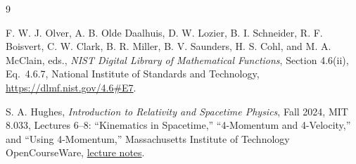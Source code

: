 \documentclass[12pt]{article}
\begin{document}
\begin{thebibliography}{9}
\small
{}
\raggedright
{}

F. W. J. Olver, A. B. Olde Daalhuis, D. W. Lozier, B. I. Schneider, R. F. Boisvert, C. W. Clark, B. R. Miller, B. V. Saunders, H. S. Cohl, and M. A. McClain, eds.,
\emph{NIST Digital Library of Mathematical Functions}, Section 4.6(ii), Eq.~4.6.7, National Institute of Standards and Technology,
\url{https://dlmf.nist.gov/4.6#E7}.

S. A. Hughes,
\emph{Introduction to Relativity and Spacetime Physics}, Fall 2024, MIT 8.033, Lectures 6--8: ``Kinematics in Spacetime,'' ``4-Momentum and 4-Velocity,'' and ``Using 4-Momentum,'' Massachusetts Institute of Technology OpenCourseWare,
\href{https://ocw.mit.edu/courses/8-033-introduction-to-relativity-and-spacetime-physics-fall-2024/pages/lecture-notes/}{lecture notes}.

\end{thebibliography}
\end{document}
